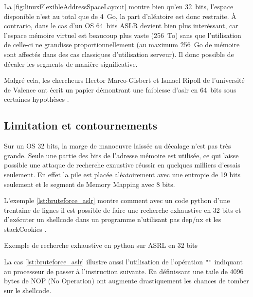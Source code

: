 La \autoref{fig:linuxFlexibleAddressSpaceLayout} montre bien qu'en 32~bits, l'espace disponible n'est au total que de 4~Go, la part d'aléatoire est donc restraite. À contrario, dans le cas d'un OS 64~bits ASLR devient bien plus interéssant, car l'espace mémoire virtuel est beaucoup plus vaste (256~To) sans que l'utilisation de celle-ci ne grandisse proportionnellement (au maximum 256~Go de mémoire sont affectés dans des cas classiques d'utilisation serveur). Il donc possible de décaler les segments de manière significative.

Malgré cela, les chercheurs Hector Marco-Gisbert et Ismael Ripoll de l'université de Valence ont écrit un papier démontrant une faiblesse d'\gls{aslr} en 64~bits sous certaines hypothèses \cite{EffectivenessFullASLR64bit}.

\vfill

\subsection{Limitation et contournements}

Sur un OS 32 bits, la marge de manoeuvre laissée au décalage n'est pas très grande. Seule une partie des bits de l'adresse mémoire est utilisée, ce qui laisse possible une attaque de recherche exaustive réussir en quelques milliers d'essais seulement. En effet la pile est placée aléatoirement avec une entropie de 19 bits seulement et le segment de Memory Mapping avec 8 bits.

L'exemple \autoref{lst:bruteforce_aslr} montre comment avec un code python d'une trentaine de lignes il est possible de faire une recherche exhaustive en 32 bits et d'exécuter un shellcode dans un programme n'utilisant pas \gls{dep}/\gls{nx} et les \gls{stackCookies} .

\newpage

\begin{listing}
	\caption{Exemple de recherche exhaustive en python sur ASRL en 32 bits}
	\label{lst:bruteforce_aslr}
\end{listing}

La cas \autoref{lst:bruteforce_aslr} illustre aussi l'utilisation de l'opération \texttt{""} indiquant au processeur de passer à l'instruction suivante. En définissant une taile de 4096 bytes de NOP (No Operation) ont augmente drastiquement les chances de tomber sur le shellcode.

